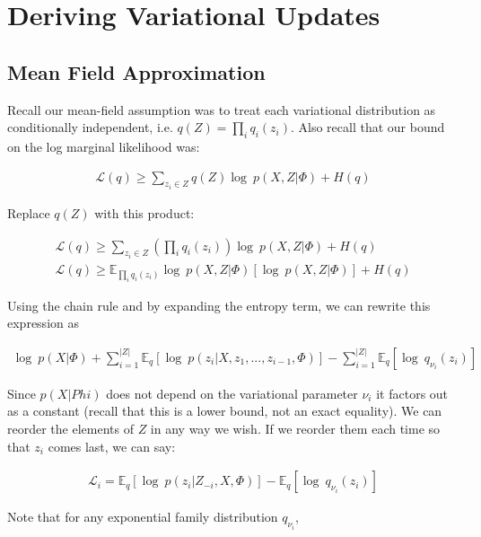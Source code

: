 

\section{Deriving Variational Updates}
\label{append_b}

\subsection{Mean Field Approximation }

Recall our mean-field assumption was to treat each variational distribution as conditionally independent, i.e. $q(Z) = \prod\limits_{i} q_i(z_i)$. Also recall that our bound on the log marginal likelihood was:


\begin{align} 
\nonumber \mathcal{L}(q) \geq \sum\limits_{z_i \in Z} q(Z) \log\ p(X,Z|\Phi) + H(q) \end{align}


Replace $q(Z)$ with this product:

\begin{align} 
\nonumber \mathcal{L}(q) \geq \sum\limits_{z_i \in Z} \left( \prod\limits_{i} q_i(z_i) \right) \log\ p(X,Z|\Phi) + H(q) \\
\mathcal{L}(q) \geq \mathbb{E}_{ \prod\limits_{i} q_i(z_i) } \log\ p(X,Z|\Phi) [\log\ p(X,Z|\Phi)] + H(q)
\end{align}

Using the chain rule and by expanding the entropy term, we can rewrite this expression as

\begin{align} \log\ p(X|\Phi) + \sum\limits_{i=1}^{| Z|} \mathbb{E}_q [\log\ p(z_i | X, z_1,..., z_{i-1}, \Phi)] - \sum\limits_{i=1}^{| Z|} \mathbb{E}_q[\log\ q_{\nu_i}(z_i)] \end{align}

Since $p(X \vert Phi)$ does not depend on the variational parameter $\nu_i$ it factors out as a constant (recall that this is a lower bound, not an exact equality). We can reorder the elements of $Z$ in any way we wish. If we reorder them each time so that $z_i$ comes last, we can say:

\begin{align} \mathcal{L}_i = \mathbb{E}_q[\log\ p(z_i| Z_{-i}, X, \Phi)] - \mathbb{E}_q[\log\ q_{\nu_i}(z_i)]
\end{align} \citep{blei:2006}

Note that for any exponential family distribution $q_{\nu_i}$, 

